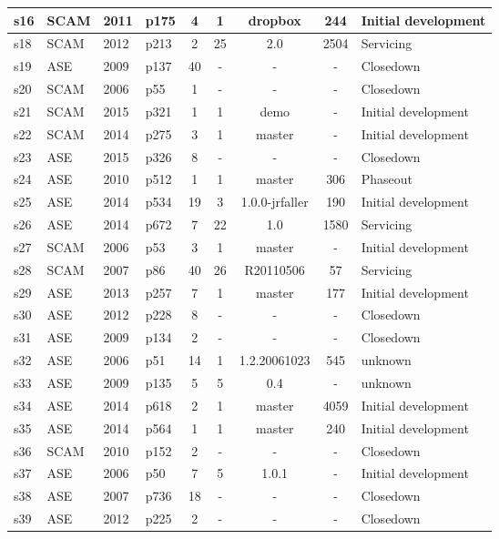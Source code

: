 \begin{longtable}{| l | l | l | l | c | c | c | c | l |}
    \hline
s16 & SCAM & 2011 & p175 & 4 & 1 & dropbox & 244 & Initial development \\
    \hline
s18 & SCAM & 2012 & p213 & 2 & 25 & 2.0 & 2504 & Servicing \\
    \hline
s19 & ASE & 2009 & p137 & 40 & - & - & - & Closedown \\
    \hline
s20 & SCAM & 2006 & p55 & 1 & - & - & - & Closedown \\
    \hline
s21 & SCAM & 2015 & p321 & 1 & 1 & demo & - & Initial development \\
    \hline
s22 & SCAM & 2014 & p275 & 3 & 1 & master & - & Initial development \\
    \hline
s23 & ASE & 2015 & p326 & 8 & - & - & - & Closedown \\
    \hline
s24 & ASE & 2010 & p512 & 1 & 1 & master & 306 & Phaseout \\
    \hline
s25 & ASE & 2014 & p534 & 19 & 3 & 1.0.0-jrfaller & 190 & Initial development \\
    \hline
s26 & ASE & 2014 & p672 & 7 & 22 & 1.0 & 1580 & Servicing \\
    \hline
s27 & SCAM & 2006 & p53 & 3 & 1 & master & - & Initial development \\
    \hline
s28 & SCAM & 2007 & p86 & 40 & 26 & R20110506 & 57 & Servicing \\
    \hline
s29 & ASE & 2013 & p257 & 7 & 1 & master & 177 & Initial development \\
    \hline
s30 & ASE & 2012 & p228 & 8 & - & - & - & Closedown \\
    \hline
s31 & ASE & 2009 & p134 & 2 & - & - & - & Closedown \\
    \hline
s32 & ASE & 2006 & p51 & 14 & 1 & 1.2.20061023 & 545 & unknown \\
    \hline
s33 & ASE & 2009 & p135 & 5 & 5 & 0.4 & - & unknown \\
    \hline
s34 & ASE & 2014 & p618 & 2 & 1 & master & 4059 & Initial development \\
    \hline
s35 & ASE & 2014 & p564 & 1 & 1 & master & 240 & Initial development \\
    \hline
s36 & SCAM & 2010 & p152 & 2 & - & - & - & Closedown \\
    \hline
s37 & ASE & 2006 & p50 & 7 & 5 & 1.0.1 & - & Initial development \\
    \hline
s38 & ASE & 2007 & p736 & 18 & - & - & - & Closedown \\
    \hline
s39 & ASE & 2012 & p225 & 2 & - & - & - & Closedown \\

\end{longtable}
